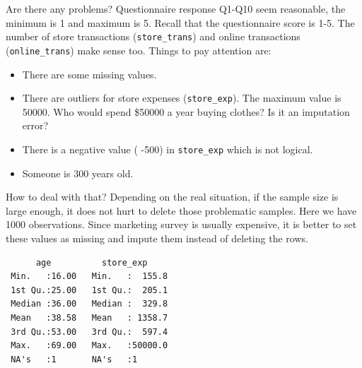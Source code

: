 \documentclass[12pt,]{krantz}
\makeatletter
\newenvironment{Shaded}{\begin{snugshade}}{\end{snugshade}}
\newcommand{\CommentTok}[1]{\textcolor[rgb]{0.37,0.37,0.37}{\textit{#1}}}
\newcommand{\DataTypeTok}[1]{\textcolor[rgb]{0.27,0.27,0.27}{#1}}
\newcommand{\DecValTok}[1]{\textcolor[rgb]{0.06,0.06,0.06}{#1}}
\newcommand{\KeywordTok}[1]{\textcolor[rgb]{0.27,0.27,0.27}{\textbf{#1}}}
\newcommand{\NormalTok}[1]{#1}
\newcommand{\OperatorTok}[1]{\textcolor[rgb]{0.43,0.43,0.43}{\textbf{#1}}}
\newcommand{\OtherTok}[1]{\textcolor[rgb]{0.37,0.37,0.37}{#1}}
\newcommand{\StringTok}[1]{\textcolor[rgb]{0.5,0.5,0.5}{#1}}
\providecommand{\tightlist}{%
  \setlength{\itemsep}{0pt}\setlength{\parskip}{0pt}}
\newenvironment{kframe}{%
\medskip{}
\setlength{\fboxsep}{.8em}
 \def\at@end@of@kframe{}%
 \ifinner\ifhmode%
  \def\at@end@of@kframe{\end{minipage}}%
  \begin{minipage}{\columnwidth}%
 \fi\fi%
 \def\FrameCommand##1{\hskip\@totalleftmargin \hskip-\fboxsep
 \colorbox{shadecolor}{##1}\hskip-\fboxsep
     \hskip-\linewidth \hskip-\@totalleftmargin \hskip\columnwidth}%
 \MakeFramed {\advance\hsize-\width
   \@totalleftmargin\z@ \linewidth\hsize
   \@setminipage}}%
 {\par\unskip\endMakeFramed%
 \at@end@of@kframe}
\renewenvironment{Shaded}{\begin{kframe}}{\end{kframe}}
\makeatother
\begin{document}
Are there any problems? Questionnaire response Q1-Q10 seem reasonable, the minimum is 1 and maximum is 5. Recall that the questionnaire score is 1-5. The number of store transactions (\texttt{store\_trans}) and online transactions (\texttt{online\_trans}) make sense too. Things to pay attention are:

\begin{itemize}
\tightlist
\item
  There are some missing values.
\item
  There are outliers for store expenses (\texttt{store\_exp}). The maximum value is 50000. Who would spend \$50000 a year buying clothes? Is it an imputation error?
\item
  There is a negative value ( -500) in \texttt{store\_exp} which is not logical.
\item
  Someone is 300 years old.
\end{itemize}

How to deal with that? Depending on the real situation, if the sample size is large enough, it does not hurt to delete those problematic samples. Here we have 1000 observations. Since marketing survey is usually expensive, it is better to set these values as missing and impute them instead of deleting the rows.

\begin{Shaded}
\end{Shaded}

\begin{verbatim}
      age          store_exp      
 Min.   :16.00   Min.   :  155.8  
 1st Qu.:25.00   1st Qu.:  205.1  
 Median :36.00   Median :  329.8  
 Mean   :38.58   Mean   : 1358.7  
 3rd Qu.:53.00   3rd Qu.:  597.4  
 Max.   :69.00   Max.   :50000.0  
 NA's   :1       NA's   :1        
\end{verbatim}
\end{document}
